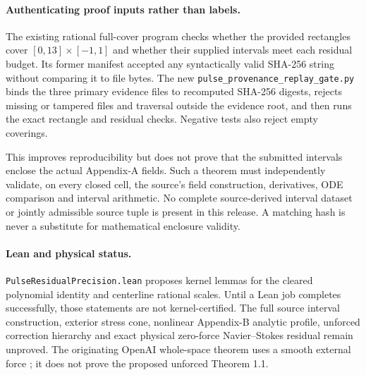 \paragraph{Authenticating proof inputs rather than labels.}
The existing rational full-cover program checks whether the
provided rectangles cover $[0,13]\times[-1,1]$ and whether
their supplied intervals meet each residual budget. Its
former manifest accepted any syntactically valid SHA-256
string without comparing it to file bytes. The new
\texttt{pulse\_provenance\_replay\_gate.py} binds the three
primary evidence files to recomputed SHA-256 digests, rejects
missing or tampered files and traversal outside the evidence
root, and then runs the exact rectangle and residual checks.
Negative tests also reject empty coverings.

This improves reproducibility but does not prove that the
submitted intervals enclose the actual Appendix-A fields.
Such a theorem must independently validate, on every closed
cell, the source's field construction, derivatives, ODE
comparison and interval arithmetic. No complete source-derived
interval dataset or jointly admissible source tuple is present
in this release. A matching hash is never a substitute for
mathematical enclosure validity.

\paragraph{Lean and physical status.}
\texttt{PulseResidualPrecision.lean} proposes kernel lemmas for
the cleared polynomial identity and centerline rational
scales. Until a Lean job completes successfully, those
statements are not kernel-certified. The full source interval
construction, exterior stress cone, nonlinear Appendix-B
analytic profile, unforced correction hierarchy and exact
physical zero-force Navier--Stokes residual remain unproved.
The originating OpenAI whole-space theorem uses a smooth
external force \cite{openai2026}; it does not prove the
proposed unforced Theorem 1.1.
